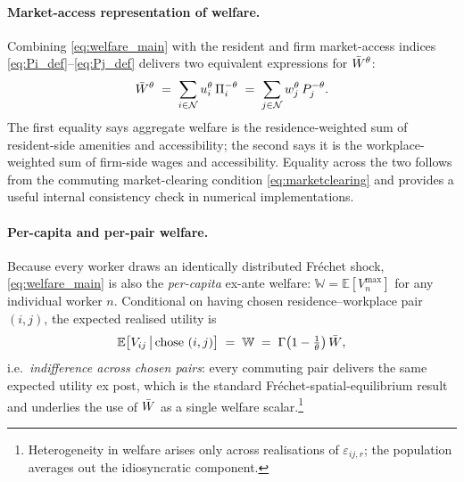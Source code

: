 \paragraph{Market-access representation of welfare.}
Combining \eqref{eq:welfare_main} with the resident and firm
market-access indices \eqref{eq:Pi_def}--\eqref{eq:Pj_def} delivers
two equivalent expressions for $\bar W^{\theta}$:
\begin{equation}
  \bar W^{\theta}
  \;=\;\sum_{i\in\mathcal N}u_i^{\theta}\,\Pi_i^{-\theta}
  \;=\;\sum_{j\in\mathcal N}w_j^{\theta}\,P_j^{-\theta}.
  \label{eq:welfare_MA}
\end{equation}
The first equality says aggregate welfare is the residence-weighted
sum of resident-side amenities and accessibility; the second says it
is the workplace-weighted sum of firm-side wages and accessibility.
Equality across the two follows from the commuting market-clearing
condition \eqref{eq:marketclearing} and provides a useful internal
consistency check in numerical implementations.

\paragraph{Per-capita and per-pair welfare.}
Because every worker draws an identically distributed Fr\'echet shock,
\eqref{eq:welfare_main} is also the \emph{per-capita} ex-ante welfare:
$\mathbb W=\mathbb E[V^{\max}_{n}]$ for any individual worker $n$.
Conditional on having chosen residence--workplace pair $(i,j)$, the
expected realised utility is
\begin{equation}
  \mathbb E\bigl[V_{ij}\,\big|\,\text{chose }(i,j)\bigr]
  \;=\;\mathbb W
  \;=\;\Gamma\!\left(1-\tfrac{1}{\theta}\right)\bar W,
  \label{eq:welfare_constant_across_pairs}
\end{equation}
i.e.\ \emph{indifference across chosen pairs}: every commuting pair
delivers the same expected utility ex post, which is the standard
Fr\'echet-spatial-equilibrium result and underlies the use of $\bar W$
as a single welfare scalar.\footnote{Heterogeneity in welfare arises
only across realisations of $\varepsilon_{ij,r}$; the population
averages out the idiosyncratic component.}


